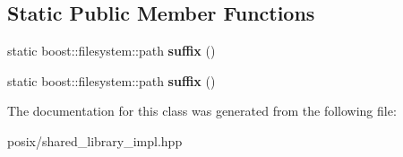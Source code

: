 \subsection*{Static Public Member Functions}
\begin{DoxyCompactItemize}
\item 
\mbox{\label{a01624_a07728a8e1ad349b2fa59a12560583e25}} 
static boost\+::filesystem\+::path {\bfseries suffix} ()
\item 
\mbox{\label{a01624_a07728a8e1ad349b2fa59a12560583e25}} 
static boost\+::filesystem\+::path {\bfseries suffix} ()
\end{DoxyCompactItemize}


The documentation for this class was generated from the following file\+:\begin{DoxyCompactItemize}
\item 
posix/shared\+\_\+library\+\_\+impl.\+hpp\end{DoxyCompactItemize}

